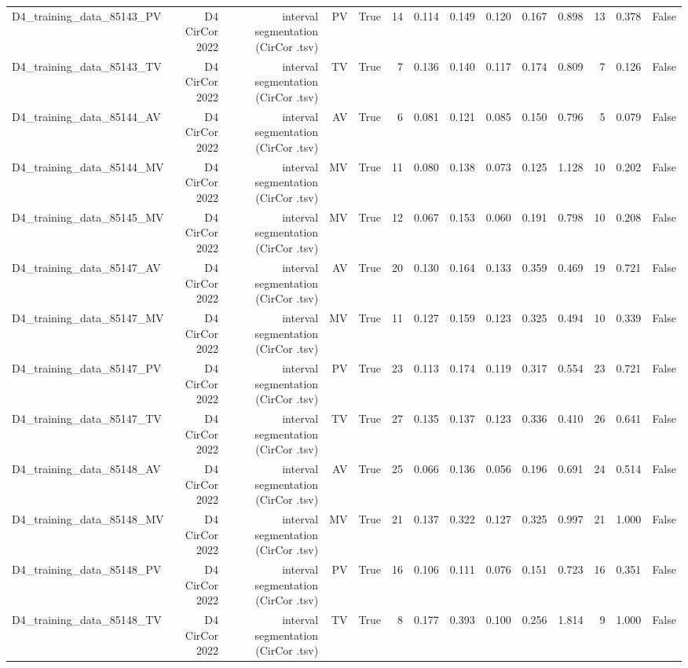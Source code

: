 \begin{table}[htbp]
\begin{tabular}{lrrrrrrrrrrrrr}
    D4\_training\_data\_85143\_PV & D4 CirCor 2022 & interval segmentation (CirCor .tsv) & PV & True & 14 & 0.114 & 0.149 & 0.120 & 0.167 & 0.898 & 13 & 0.378 & False \\
    D4\_training\_data\_85143\_TV & D4 CirCor 2022 & interval segmentation (CirCor .tsv) & TV & True & 7 & 0.136 & 0.140 & 0.117 & 0.174 & 0.809 & 7 & 0.126 & False \\
    D4\_training\_data\_85144\_AV & D4 CirCor 2022 & interval segmentation (CirCor .tsv) & AV & True & 6 & 0.081 & 0.121 & 0.085 & 0.150 & 0.796 & 5 & 0.079 & False \\
    D4\_training\_data\_85144\_MV & D4 CirCor 2022 & interval segmentation (CirCor .tsv) & MV & True & 11 & 0.080 & 0.138 & 0.073 & 0.125 & 1.128 & 10 & 0.202 & False \\
    D4\_training\_data\_85145\_MV & D4 CirCor 2022 & interval segmentation (CirCor .tsv) & MV & True & 12 & 0.067 & 0.153 & 0.060 & 0.191 & 0.798 & 10 & 0.208 & False \\
    D4\_training\_data\_85147\_AV & D4 CirCor 2022 & interval segmentation (CirCor .tsv) & AV & True & 20 & 0.130 & 0.164 & 0.133 & 0.359 & 0.469 & 19 & 0.721 & False \\
    D4\_training\_data\_85147\_MV & D4 CirCor 2022 & interval segmentation (CirCor .tsv) & MV & True & 11 & 0.127 & 0.159 & 0.123 & 0.325 & 0.494 & 10 & 0.339 & False \\
    D4\_training\_data\_85147\_PV & D4 CirCor 2022 & interval segmentation (CirCor .tsv) & PV & True & 23 & 0.113 & 0.174 & 0.119 & 0.317 & 0.554 & 23 & 0.721 & False \\
    D4\_training\_data\_85147\_TV & D4 CirCor 2022 & interval segmentation (CirCor .tsv) & TV & True & 27 & 0.135 & 0.137 & 0.123 & 0.336 & 0.410 & 26 & 0.641 & False \\
    D4\_training\_data\_85148\_AV & D4 CirCor 2022 & interval segmentation (CirCor .tsv) & AV & True & 25 & 0.066 & 0.136 & 0.056 & 0.196 & 0.691 & 24 & 0.514 & False \\
    D4\_training\_data\_85148\_MV & D4 CirCor 2022 & interval segmentation (CirCor .tsv) & MV & True & 21 & 0.137 & 0.322 & 0.127 & 0.325 & 0.997 & 21 & 1.000 & False \\
    D4\_training\_data\_85148\_PV & D4 CirCor 2022 & interval segmentation (CirCor .tsv) & PV & True & 16 & 0.106 & 0.111 & 0.076 & 0.151 & 0.723 & 16 & 0.351 & False \\
    D4\_training\_data\_85148\_TV & D4 CirCor 2022 & interval segmentation (CirCor .tsv) & TV & True & 8 & 0.177 & 0.393 & 0.100 & 0.256 & 1.814 & 9 & 1.000 & False \\

\end{tabular}
\end{table}

